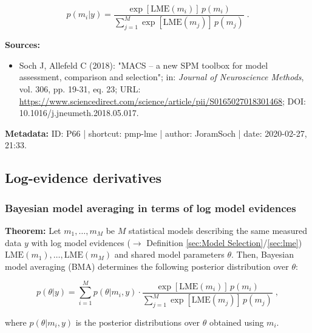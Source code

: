\documentclass[a4paper,12pt,twoside]{book}
\begin{document}
\begin{equation} \label{eq:pmp-lme-PMP-s2}
p(m_i|y) = \frac{\exp[\mathrm{LME}(m_i)] \, p(m_i)}{\sum_{j=1}^{M} \exp[\mathrm{LME}(m_j)] \, p(m_j)} \; .
\end{equation}


\vspace{1em}
\textbf{Sources:}
\begin{itemize}
\item Soch J, Allefeld C (2018): "MACS – a new SPM toolbox for model assessment, comparison and selection"; in: \textit{Journal of Neuroscience Methods}, vol. 306, pp. 19-31, eq. 23; URL: \url{https://www.sciencedirect.com/science/article/pii/S0165027018301468}; DOI: 10.1016/j.jneumeth.2018.05.017.
\end{itemize}


\vspace{1em}
\textbf{Metadata:} ID: P66 | shortcut: pmp-lme | author: JoramSoch | date: 2020-02-27, 21:33.
\vspace{1em}



\subsection{Log-evidence derivatives}

\subsubsection[\textbf{Bayesian model averaging in terms of log model evidences}]{Bayesian model averaging in terms of log model evidences} \label{sec:bma-lme}
\setcounter{equation}{0}

\textbf{Theorem:} Let $m_1, \ldots, m_M$ be $M$ statistical models describing the same measured data $y$ with log model evidences ($\rightarrow$ Definition \ref{sec:Model Selection}/\ref{sec:lme}) $\mathrm{LME}(m_1), \ldots, \mathrm{LME}(m_M)$ and shared model parameters $\theta$. Then, Bayesian model averaging (BMA) determines the following posterior distribution over $\theta$:

\begin{equation} \label{eq:bma-lme-BMA-LME}
p(\theta|y) = \sum_{i=1}^{M} p(\theta|m_i,y) \cdot \frac{\exp[\mathrm{LME}(m_i)] \, p(m_i)}{\sum_{j=1}^{M} \exp[\mathrm{LME}(m_j)] \, p(m_j)} \; ,
\end{equation}

where $p(\theta \vert m_i,y)$ is the posterior distributions over $\theta$ obtained using $m_i$.
\end{document}
